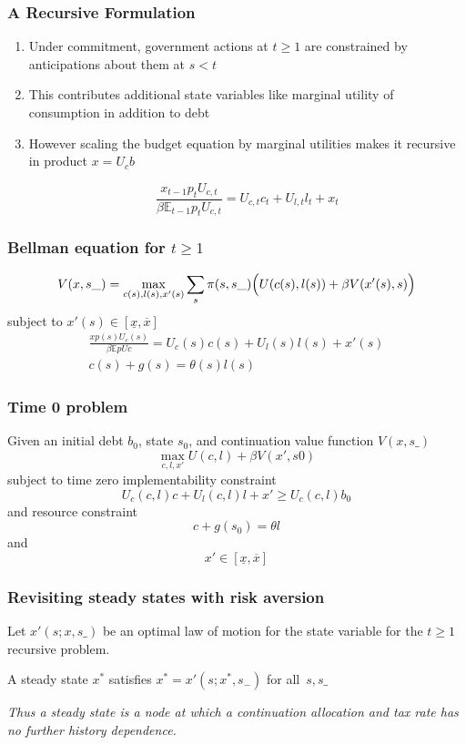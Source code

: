 \documentclass{beamer}
\newcommand{\EE}{\mathbb E}
\begin{document}
 \begin{frame}
	\frametitle{A Recursive Formulation}
	
	\begin{enumerate}
	 \item Under commitment, government actions at $t \geq 1$ are constrained by  anticipations about them at $s < t$ 
	 \item This contributes additional state variables like marginal utility of consumption in addition to debt
	 \item However scaling the budget equation by marginal utilities makes it recursive in product $x=U_c b$
	
	\[
		\frac{x_{t-1} p_t U_{c,t}}{\beta \EE_{t-1} p_t U_{c,t}}  = U_{c,t}c_t+U_{l,t} l_t + x_t
	\]
	
	\end{enumerate}
	
	
	\end{frame}
	\begin{frame}
	\frametitle{Bellman equation for $t\geq1$}
	\[
		V(x,s\_) = \max_{c(s),l(s),x'(s)} \sum_s \pi(s,s\_)\Bigl(U(c(s),l(s)) + \beta V(x'(s),s)\Bigr)
	\]subject to $x'(s)\in [\underline x,\overline x]$
	\begin{align*}
		\frac{x p(s) U_c(s)}{\beta\EE pUc} =U_c(s)c(s)+U_l(s)l(s) + x'(s)\\
		c(s) + g(s) = \theta(s)l(s)
	\end{align*}
	
 \end{frame}
\begin{frame}
	\frametitle{Time 0 problem}
	Given an initial  debt $b_0$, state $s_0$,  and continuation value function $V(x,s\_)$ 
	\[
		\max_{c,l,x'} U(c,l) +\beta V(x',s0)
	\]subject to  time zero implementability constraint
	\[
		U_{c}(c,l)c + U_l(c,l) l + x' \geq U_c(c,l) b_0
	\]and  resource constraint
	\[
		c+ g(s_0) = \theta l
	\]and
	\[
		x' \in [\underline x,\overline x]
	\]
\end{frame}



\begin{frame}
 \frametitle{Revisiting steady states with risk aversion}
Let $x'\left( s;{x},s\_\right) $ be an optimal  law of motion for the state variable
for the $t\geq1$ recursive problem. 

\begin{definition}
 A steady state  ${x}^{*} $  satisfies ${ x}^{*}  =x' \left( s;{x}^{*},s_{-}\right) $ for all $%
\,s,s\_$
\end{definition}


\vspace{3mm}
\emph{Thus a steady state is a node at which a continuation allocation and tax rate has no further history dependence. }

 \end{frame}
\end{document}
